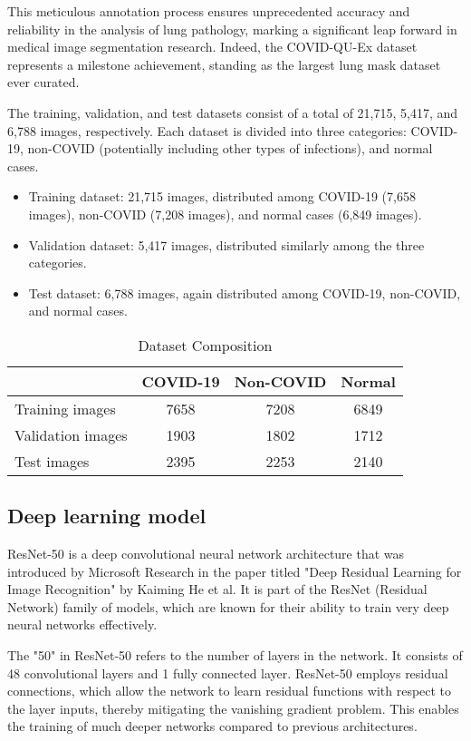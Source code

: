 \documentclass{article}
\begin{document}
This meticulous annotation process ensures unprecedented accuracy and reliability in the analysis of lung pathology, marking a significant leap forward in medical image segmentation research. 
Indeed, the COVID-QU-Ex dataset represents a milestone achievement, standing as the largest lung mask dataset ever curated.

The training, validation, and test datasets consist of a total of 21,715, 5,417, and 6,788 images, respectively. Each dataset is divided into three categories: COVID-19, non-COVID (potentially including other types of infections), and normal cases.
\begin{itemize}
    \item Training dataset: 21,715 images, distributed among COVID-19 (7,658 images), non-COVID (7,208 images), and normal cases (6,849 images).
    \item Validation dataset: 5,417 images, distributed similarly among the three categories.
    \item Test dataset: 6,788 images, again distributed among COVID-19, non-COVID, and normal cases.
\end{itemize}

\begin{table}[htbp]
    \centering
    \caption{Dataset Composition}
    \begin{tabular}{lccc}
        \toprule
        & \textbf{COVID-19} & \textbf{Non-COVID} & \textbf{Normal} \\
        \midrule
        Training images & 7658 & 7208 & 6849 \\
        Validation images & 1903 & 1802 & 1712 \\
        Test images & 2395 & 2253 & 2140 \\
        \bottomrule
    \end{tabular}
\end{table}

\subsection{Deep learning model}
ResNet-50 is a deep convolutional neural network architecture that was introduced by Microsoft Research in the paper titled "Deep Residual Learning for Image Recognition" by Kaiming He et al. 
It is part of the ResNet (Residual Network) family of models, which are known for their ability to train very deep neural networks effectively.

The "50" in ResNet-50 refers to the number of layers in the network. 
It consists of 48 convolutional layers and 1 fully connected layer. ResNet-50 employs residual connections, which allow the network to learn residual functions with respect to the layer inputs, thereby mitigating the vanishing gradient problem. 
This enables the training of much deeper networks compared to previous architectures.
\end{document}
